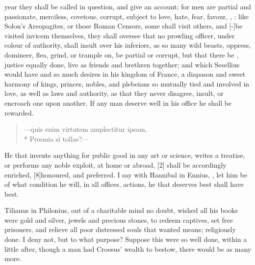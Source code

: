 {year they shall be called in question, and give an account; for men are
partial and passionate, merciless, covetous, corrupt, subject to love,
hate, fear, favour, \etc{}, : like Solon's
Areopagites, or those Roman Censors, some shall visit others, and
[-\baselineskip]be visited invicem themselves,  they shall oversee that no
prowling officer, under colour of authority, shall insult over his
inferiors, as so many wild beasts, oppress, domineer, flea, grind, or
trample on, be partial or corrupt, but that there be ,
justice equally done, live as friends and brethren together; and which
Sesellius would have and so much desires in his kingdom of France,
a diapason and sweet harmony of kings, princes, nobles, and plebeians
so mutually tied and involved in love, as well as laws and authority,
as that they never disagree, insult, or encroach one upon another. If
any man deserve well in his office he shall be rewarded.

\begin{verse}
---\textlatin{quis enim virtutem amplectitur ipsam,}\\*
\textlatin{Pr\oe{}mia si tollas?}---
\end{verse}

He that invents anything for public good in any art or science, writes
a treatise, or performs any noble exploit, at home or abroad,
[2\baselineskip] shall be accordingly enriched, [8\baselineskip]honoured, and preferred. I
say with Hannibal in Ennius, , let him be of what condition he will, in all offices,
actions, he that deserves best shall have best.

Tilianus in Philonius, out of a charitable mind no doubt, wished all
his books were gold and silver, jewels and precious stones, to
redeem captives, set free prisoners, and relieve all poor distressed
souls that wanted means; religiously done. I deny not, but to what
purpose? Suppose this were so well done, within a little after, though
a man had Croesus' wealth to bestow, there would be as many more.

}
